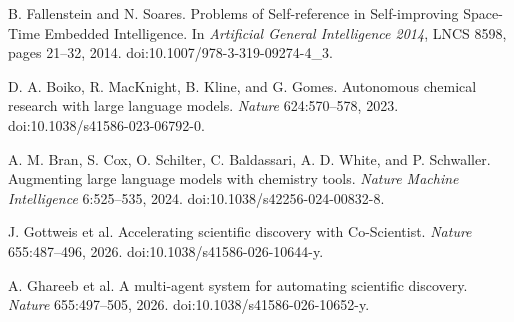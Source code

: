 B. Fallenstein and N. Soares. Problems of Self-reference in Self-improving Space-Time Embedded Intelligence. In \emph{Artificial General Intelligence 2014}, LNCS 8598, pages 21--32, 2014. doi:10.1007/978-3-319-09274-4\_3.

D. A. Boiko, R. MacKnight, B. Kline, and G. Gomes. Autonomous chemical research with large language models. \emph{Nature} 624:570--578, 2023. doi:10.1038/s41586-023-06792-0.

A. M. Bran, S. Cox, O. Schilter, C. Baldassari, A. D. White, and P. Schwaller. Augmenting large language models with chemistry tools. \emph{Nature Machine Intelligence} 6:525--535, 2024. doi:10.1038/s42256-024-00832-8.

J. Gottweis et al. Accelerating scientific discovery with Co-Scientist. \emph{Nature} 655:487--496, 2026. doi:10.1038/s41586-026-10644-y.

A. Ghareeb et al. A multi-agent system for automating scientific discovery. \emph{Nature} 655:497--505, 2026. doi:10.1038/s41586-026-10652-y.
